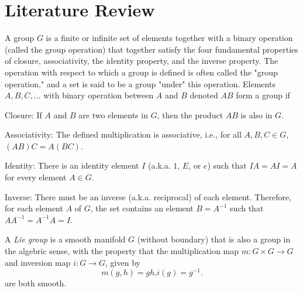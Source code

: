 \documentclass[../main.tex]{subfiles}
\begin{document}
\section{Literature Review}
\begin{definition}\label{Group}
    A group \(G\) is a finite or infinite set of elements
    together with a binary operation (called the group operation)
    that together satisfy the four fundamental properties of
    closure, associativity, the identity property, and the inverse property.
    The operation with respect to which a group is defined is often called the "group operation,"
    and a set is said to be a group "under" this operation.
    Elements \(A,B,C,\dots\)
    with binary operation between \(A\) and \(B\) denoted \(AB\) form a group if
    \begin{APAenumerate}
        \item Closure: If \(A\) and \(B\) are two elements in \(G\), then the product \(AB\) is also in \(G\).
        \item Associativity: The defined multiplication is associative, i.e., for all \(A,B,C \in G\), \(\left(AB\right)C=A\left(BC\right)\).
        \item Identity: There is an identity element \(I\) (a.k.a. \(1\), \(E\), or \(e\)) such that \(IA=AI=A\) for every element \(A \in G\).
        \item Inverse: There must be an inverse (a.k.a. reciprocal) of each element.
        Therefore, for each element \(A\) of \(G\), the set contains an element \(B=A^{-1}\) such that \(AA^{-1}=A^{-1}A=I\).
    \end{APAenumerate}
\end{definition}
\begin{definition}\label{LieGroup}
    A \textit{Lie group} is a smooth manifold \(G\) (without boundary)
    that is also a group in the algebric sense,
    with the property that
    the multiplication map \(m\colon G\times G\to G\)
    and inversion map \(i\colon G\to G\),
    given by
    \begin{equation*}
        m\left(g,h\right) = gh\text{,}
        i\left(g\right) = g^{-1}\text{.}
    \end{equation*}
    are both smooth.
\end{definition}
\end{document}
